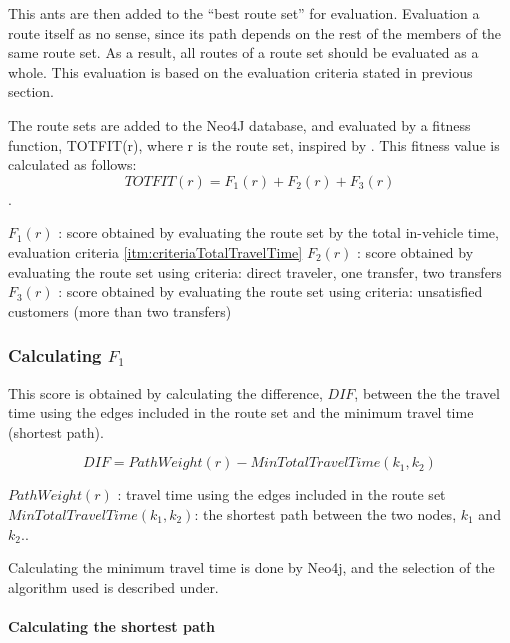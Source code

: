 This ants are then added to the ``best route set'' for evaluation. Evaluation a route itself as no sense, since its path depends on the rest of the members of the same route set. As a result, all routes of a route set should be evaluated as a whole. This evaluation is based on the evaluation criteria stated in previous section.

The route sets are added to the Neo4J database, and evaluated by a fitness function, TOTFIT(r), where r is the route set, inspired by \citep{kechagiopoulos14}.
This fitness value is calculated as follows:
$$ TOTFIT(r) = F_{1}(r) + F_{2}(r) + F_{3}(r)$$. 

$ F_{1}(r)$ : score obtained by evaluating the route set by the total in-vehicle time, evaluation criteria \ref{itm:criteriaTotalTravelTime}
\newline
$ F_{2}(r)$ : score obtained by evaluating the route set using criteria: direct traveler, one transfer, two transfers
\newline
$ F_{3}(r)$ : score obtained by evaluating the route set using criteria: unsatisfied customers (more than two transfers)
\newline

\subsubsection{Calculating $F_{1}$}

This score is obtained by calculating the difference, $DIF$, between the the travel time using the edges included in the route set and the minimum travel time (shortest path). 

$$ DIF = PathWeight(r) - MinTotalTravelTime(k_{1},k_{2})$$

$ PathWeight(r)$ : travel time using the edges included in the route set
\newline
$ MinTotalTravelTime(k_{1},k_{2})$: the shortest path between the two nodes, $k_{1}$ and $k_{2}$..

Calculating the minimum travel time is done by Neo4j, and the selection of the algorithm used is described under.

\paragraph{Calculating the shortest path}\mbox{}\\ 

